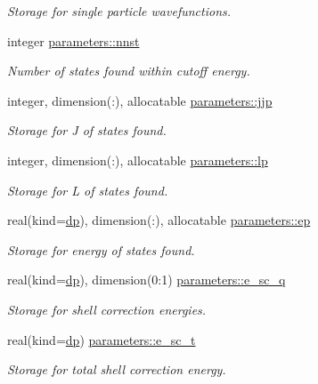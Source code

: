 \begin{DoxyCompactItemize}
\begin{DoxyCompactList}\small\item\em Storage for single particle wavefunctions. \end{DoxyCompactList}\item 
integer \mbox{\hyperlink{group__STRUTINSKY_gae6e7b96f6ed3aba1ba90ec3567d8e83d}{parameters\+::nnst}}
\begin{DoxyCompactList}\small\item\em Number of states found within cutoff energy. \end{DoxyCompactList}\item 
integer, dimension(\+:), allocatable \mbox{\hyperlink{group__STRUTINSKY_ga73b3d3e4bef13fcc24049d5e9fe16bb2}{parameters\+::jjp}}
\begin{DoxyCompactList}\small\item\em Storage for J of states found. \end{DoxyCompactList}\item 
integer, dimension(\+:), allocatable \mbox{\hyperlink{group__STRUTINSKY_gaff7c4f2e2ade60a6581e2335dca2eda3}{parameters\+::lp}}
\begin{DoxyCompactList}\small\item\em Storage for L of states found. \end{DoxyCompactList}\item 
real(kind=\mbox{\hyperlink{namespaceparameters_a52f8c6351fd79345d8811e065bcbbb37}{dp}}), dimension(\+:), allocatable \mbox{\hyperlink{group__STRUTINSKY_gaa02842b39c139c8fe6da09650a18113a}{parameters\+::ep}}
\begin{DoxyCompactList}\small\item\em Storage for energy of states found. \end{DoxyCompactList}\item 
real(kind=\mbox{\hyperlink{namespaceparameters_a52f8c6351fd79345d8811e065bcbbb37}{dp}}), dimension(0\+:1) \mbox{\hyperlink{group__STRUTINSKY_ga8f402c8fe224c0fa1965b57701b6e597}{parameters\+::e\+\_\+sc\+\_\+q}}
\begin{DoxyCompactList}\small\item\em Storage for shell correction energies. \end{DoxyCompactList}\item 
real(kind=\mbox{\hyperlink{namespaceparameters_a52f8c6351fd79345d8811e065bcbbb37}{dp}}) \mbox{\hyperlink{group__STRUTINSKY_ga48fd0dbdf687c86420599443535e70c8}{parameters\+::e\+\_\+sc\+\_\+t}}
\begin{DoxyCompactList}\small\item\em Storage for total shell correction energy. \end{DoxyCompactList}\end{DoxyCompactItemize}


